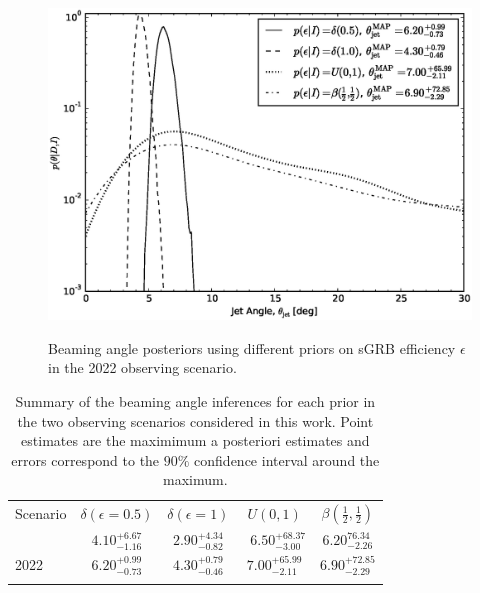 \documentclass[twocolumn,nofootinbib]{revtex4-1}
\begin{document}
\begin{figure}
\centering
{\includegraphics[width=\linewidth]{jet_angle_posterior_aligo_2022_re_real.eps}}
\caption{Beaming angle posteriors using different priors on \ac{sGRB} efficiency $\epsilon$ in the 2022 observing scenario.
    \label{fig:jetposterior2022}}
\end{figure}

\begin{table}
\centering
\begin{tabular}{l c c c c }
\toprule
Scenario & $\delta(\epsilon=0.5)$ & $\delta(\epsilon=1)$ & $U(0,1)$ & $\beta(\frac{1}{2},\frac{1}{2})$\\
\cline{1-1}\cline{2-5}
\colrule
2016  & $4.10^{+6.67}_{-1.16}$ & $2.90^{+4.34}_{-0.82}$ &\ $6.50^{+68.37}_{-3.00}$ & $6.20^{76.34}_{-2.26}$ \\
2022 & $6.20^{+0.99}_{-0.73}$ & $4.30^{+0.79}_{-0.46}$ & $7.00^{+65.99}_{-2.11}$ & $6.90^{+72.85}_{-2.29}$ \\
\botrule
\end{tabular}
\caption{Summary of the beaming angle inferences for each prior in the two observing scenarios considered in this work.
    Point estimates are the maximimum a posteriori estimates and errors correspond to the $90\%$ confidence interval around the maximum.
    \label{table:aligo_beam_inference}}
\end{table}

%
\end{document}
